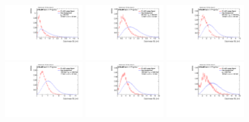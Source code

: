 \begin{figure}
\bigskip
\includegraphics[width=0.3\textwidth]{sascha_input/Appendix/Distributions/w/distributions/beta2/h_recoJet_D2_2_bin1.pdf} \hspace{1mm}
\includegraphics[width=0.3\textwidth]{sascha_input/Appendix/Distributions/w/distributions/beta2/h_recoJet_D2_2_bin2.pdf} \hspace{1mm}
\includegraphics[width=0.3\textwidth]{sascha_input/Appendix/Distributions/w/distributions/beta2/h_recoJet_D2_2_bin3.pdf} 
\bigskip
\includegraphics[width=0.3\textwidth]{sascha_input/Appendix/Distributions/w/distributions/beta2/h_recoJet_D2_2_bin4.pdf} \hspace{1mm}
\includegraphics[width=0.3\textwidth]{sascha_input/Appendix/Distributions/w/distributions/beta2/h_recoJet_D2_2_bin5.pdf} \hspace{1mm}
\includegraphics[width=0.3\textwidth]{sascha_input/Appendix/Distributions/w/distributions/beta2/h_recoJet_D2_2_bin6.pdf}

\end{figure}
